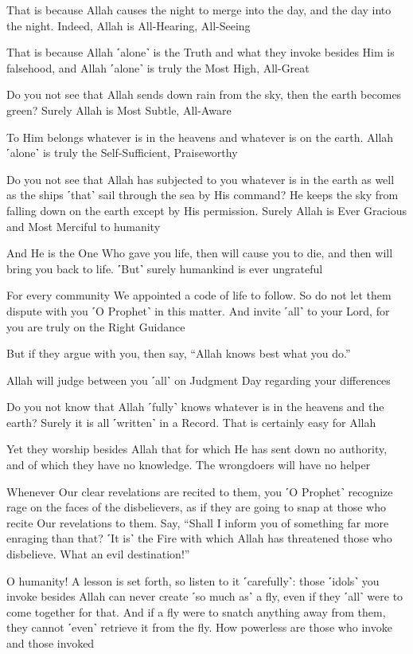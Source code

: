 That is because Allah causes the night to merge into the day, and the day into the night. Indeed, Allah is All-Hearing, All-Seeing

That is because Allah ˹alone˺ is the Truth and what they invoke besides Him is falsehood, and Allah ˹alone˺ is truly the Most High, All-Great

Do you not see that Allah sends down rain from the sky, then the earth becomes green? Surely Allah is Most Subtle, All-Aware

To Him belongs whatever is in the heavens and whatever is on the earth. Allah ˹alone˺ is truly the Self-Sufficient, Praiseworthy

Do you not see that Allah has subjected to you whatever is in the earth as well as the ships ˹that˺ sail through the sea by His command? He keeps the sky from falling down on the earth except by His permission. Surely Allah is Ever Gracious and Most Merciful to humanity

And He is the One Who gave you life, then will cause you to die, and then will bring you back to life. ˹But˺ surely humankind is ever ungrateful

For every community We appointed a code of life to follow. So do not let them dispute with you ˹O Prophet˺ in this matter. And invite ˹all˺ to your Lord, for you are truly on the Right Guidance

But if they argue with you, then say, “Allah knows best what you do.”

Allah will judge between you ˹all˺ on Judgment Day regarding your differences

Do you not know that Allah ˹fully˺ knows whatever is in the heavens and the earth? Surely it is all ˹written˺ in a Record. That is certainly easy for Allah

Yet they worship besides Allah that for which He has sent down no authority, and of which they have no knowledge. The wrongdoers will have no helper

Whenever Our clear revelations are recited to them, you ˹O Prophet˺ recognize rage on the faces of the disbelievers, as if they are going to snap at those who recite Our revelations to them. Say, “Shall I inform you of something far more enraging than that? ˹It is˺ the Fire with which Allah has threatened those who disbelieve. What an evil destination!”

O humanity! A lesson is set forth, so listen to it ˹carefully˺: those ˹idols˺ you invoke besides Allah can never create ˹so much as˺ a fly, even if they ˹all˺ were to come together for that. And if a fly were to snatch anything away from them, they cannot ˹even˺ retrieve it from the fly. How powerless are those who invoke and those invoked

